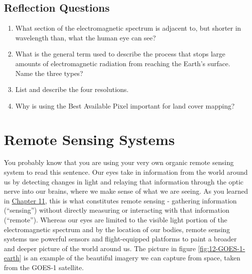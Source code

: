 \documentclass[
]{book}
\providecommand{\tightlist}{%
  \setlength{\itemsep}{0pt}\setlength{\parskip}{0pt}}
\begin{document}
\hypertarget{reflection-questions-8}{%
\section{Reflection Questions}\label{reflection-questions-8}}

\begin{enumerate}
\def\labelenumi{\arabic{enumi}.}
\tightlist
\item
  What section of the electromagnetic spectrum is adjacent to, but
  shorter in wavelength than, what the human eye can see?
\item
  What is the general term used to describe the process that stops
  large amounts of electromagnetic radiation from reaching the Earth's
  surface. Name the three types?
\item
  List and describe the four resolutions.
\item
  Why is using the Best Available Pixel important for land cover
  mapping?
\end{enumerate}

\hypertarget{remote-sensing-systems}{%
\chapter{Remote Sensing Systems}\label{remote-sensing-systems}}

You probably know that you are using your very own organic remote sensing system to read this sentence. Our eyes take in information from the world around us by detecting changes in light and relaying that information through the optic nerve into our brains, where we make sense of what we are seeing. As you learned in \href{https://ubc-geomatics-textbook.github.io/geomatics-textbook/fundamentals-of-remote-sensing.html}{Chapter 11}, this is what constitutes remote sensing - gathering information (``sensing'') without directly measuring or interacting with that information (``remote''). Whereas our eyes are limited to the visible light portion of the electromagnetic spectrum and by the location of our bodies, remote sensing systems use powerful sensors and flight-equipped platforms to paint a broader and deeper picture of the world around us. The picture in figure \ref{fig:12-GOES-1-earth} is an example of the beautiful imagery we can capture from space, taken from the GOES-1 satellite.
\end{document}
